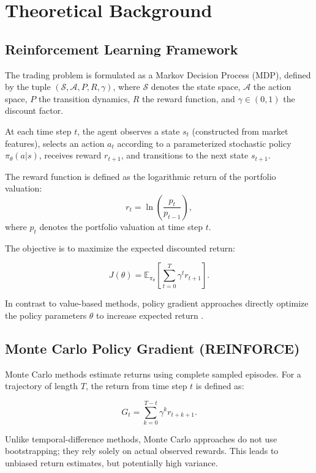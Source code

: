 \section{Theoretical Background}

\subsection{Reinforcement Learning Framework}

The trading problem is formulated as a Markov Decision Process (MDP), defined by the tuple 
$(\mathcal{S}, \mathcal{A}, P, R, \gamma)$, where $\mathcal{S}$ denotes the state space, 
$\mathcal{A}$ the action space, $P$ the transition dynamics, $R$ the reward function, and 
$\gamma \in (0,1)$ the discount factor.

At each time step $t$, the agent observes a state $s_t$ (constructed from market features), 
selects an action $a_t$ according to a parameterized stochastic policy $\pi_\theta(a|s)$, 
receives reward $r_{t+1}$, and transitions to the next state $s_{t+1}$.

The reward function is defined as the logarithmic return of the portfolio valuation:
\[
r_t = \ln\left(\frac{p_t}{p_{t-1}}\right),
\]
where $p_t$ denotes the portfolio valuation at time step $t$.

The objective is to maximize the expected discounted return:

\[
J(\theta) = \mathbb{E}_{\pi_\theta} 
\left[ 
\sum_{t=0}^{T} \gamma^t r_{t+1} 
\right].
\]

In contrast to value-based methods, policy gradient approaches directly optimize 
the policy parameters $\theta$ to increase expected return \citep{wikipediapolicysradient}.

\subsection{Monte Carlo Policy Gradient (REINFORCE)}

Monte Carlo methods estimate returns using complete sampled episodes. 
For a trajectory of length $T$, the return from time step $t$ is defined as:

\[
G_t = \sum_{k=0}^{T-t} \gamma^k r_{t+k+1}.
\]

Unlike temporal-difference methods, Monte Carlo approaches do not use bootstrapping; 
they rely solely on actual observed rewards. This leads to unbiased return estimates, 
but potentially high variance.

